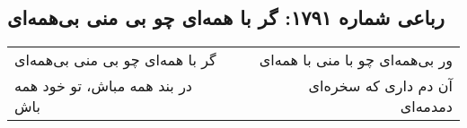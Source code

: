 \begin{center}
\section*{رباعی شماره ۱۷۹۱: گر با همه‌ای چو بی منی بی‌همه‌ای}
\label{sec:1791}
\begin{longtable}{l p{0.5cm} r}
گر با همه‌ای چو بی منی بی‌همه‌ای
&&
ور بی‌همه‌ای چو با منی با همه‌ای
\\
در بند همه مباش، تو خود همه باش
&&
آن دم داری که سخره‌ای دمدمه‌ای
\\
\end{longtable}
\end{center}
